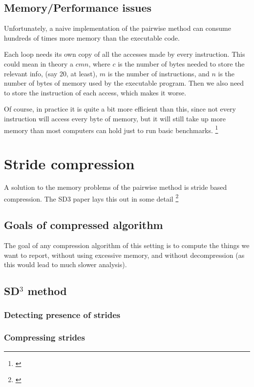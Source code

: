 \documentclass[12pt,twoside]{reedthesis}
\begin{document}
		
		\subsection{Memory/Performance issues}
		
		Unfortunately, a naive implementation of the pairwise method can consume hundreds of times more memory than the executable code. 
		
		Each loop needs its own copy of all the accesses made by every instruction. This could mean in theory a $cmn$, where $c$ is the number of bytes needed to store the relevant info, (say 20, at least), $m$ is the number of instructions, and $n$ is the number of bytes of memory used by the executable program. Then we also need to store the instruction of each access, which makes it worse. 
		
		Of course, in practice it is quite a bit more efficient than this, since not every instruction will access every byte of memory, but it will still take up more memory than most computers can hold just to run basic benchmarks. \footnote{\cite{Kim:2010}}
		
	\section{Stride compression}

		A solution to the memory problems of the pairwise method is stride based compression. The SD3 paper lays this out in some detail \footnote{\cite{Kim:2010}}
		
		\subsection{Goals of compressed algorithm}
		The goal of any compression algorithm of this setting is to compute the things we want to report, without using excessive memory, and without decompression (as this would lead to much slower analysis).
		
		\subsection{SD$^3$ method}
		
		\subsubsection{Detecting presence of strides}
		\subsubsection{Compressing strides}
\end{document}
